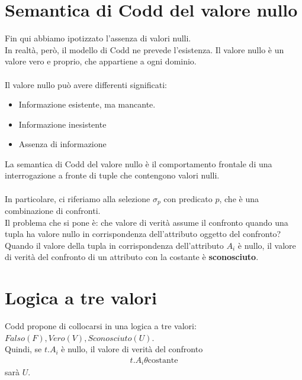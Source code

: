 \section{Semantica di Codd del valore nullo}
Fin qui abbiamo ipotizzato l'assenza di valori nulli.\\
In realtà, però, il modello di Codd ne prevede l'esistenza. Il valore nullo è un valore vero e proprio, che appartiene a ogni dominio.\\\\
Il valore nullo può avere differenti significati:
    \begin{itemize}
        \item{Informazione esistente, ma mancante.}
        \item{Informazione inesistente}
        \item{Assenza di informazione}
    \end{itemize}
La semantica di Codd del valore nullo è il comportamento frontale di una interrogazione a fronte di tuple che contengono valori nulli.\\\\
In particolare, ci riferiamo alla selezione $\sigma_p$ con predicato $p$, che è una combinazione di confronti.\\
Il problema che si pone è: che valore di verità assume il confronto quando una tupla ha valore nullo in corrispondenza dell'attributo oggetto del confronto?\\
Quando il valore della tupla in corrispondenza dell'attributo $A_i$ è nullo, il valore di verità del confronto di un attributo con la costante è \textbf{sconosciuto}.

\section{Logica a tre valori}
Codd propone di collocarsi in una logica a tre valori: $Falso(F), Vero(V), Sconosciuto(U)$.\\
Quindi, se $t.A_i$ è nullo, il valore di verità del confronto   
    \begin{equation}\begin{aligned}
        t.A_i \theta \text{costante}
    \end{aligned}\end{equation}
sarà $U$.

